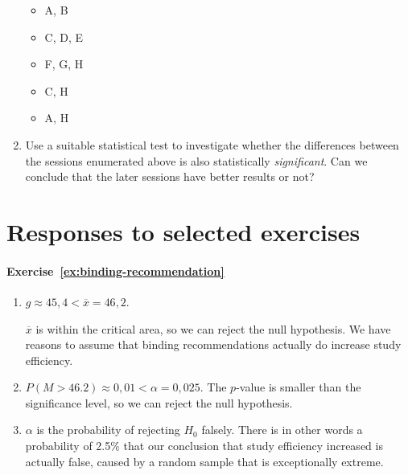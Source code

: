 \begin{exercise}
\begin{enumerate}
    \begin{itemize}
      \item A, B
      \item C, D, E
      \item F, G, H
      \item C, H
      \item A, H
    \end{itemize}
  
    \item Use a suitable statistical test to investigate whether the differences between the sessions enumerated above is also statistically \emph{significant}. Can we conclude that the later sessions have better results or not?
  \end{enumerate}
\end{exercise}

\section{Responses to selected exercises}
\label{sec:hypothesis-tests-responses}

%
%
%

\paragraph{Exercise~\ref{ex:binding-recommendation}}

\begin{enumerate}
  \item $g \approx 45,4 < \overline{x} = 46,2$.
  
  $\overline{x}$ is within the critical area, so we can reject the null hypothesis. We have reasons to assume that binding recommendations actually do increase study efficiency. 
  
  \item $P(M > 46.2) \approx 0,01 < \alpha = 0,025$. The $p$-value is smaller than the significance level, so we can reject the null hypothesis.
  
  \item  $\alpha$ is the probability of rejecting $H_{0}$ falsely. There is in other words a probability of 2.5\% that our conclusion that study efficiency increased is actually false, caused by a random sample that is exceptionally extreme.
\end{enumerate}

